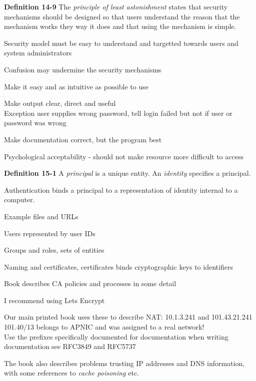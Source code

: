 \documentclass[Screen16to9,17pt]{foils}
\begin{document}

\begin{list1}
\item {\bf Definition 14-9} The \emph{principle of least astonishment} states that security mechanisms should be designed so that users understand the reason that the mechanism works they way it does and that using the mechanism is simple.
\item Security model must be easy to understand and targetted towards users and system administrators
\item Confusion may undermine the security mechanisms
\item Make it easy and as intuitive as possible to use
\item Make output clear, direct and useful\\
Exception user supplies wrong password, tell login failed but not if user or password was wrong
\item Make documentation correct, but the program best
\item Psychological acceptability - should not make resource more difficult to access
\end{list1}





\begin{list1}
\item
\item {\bf Definition 15-1} A \emph{principal} is a unique entity. An \emph{identity} specifies a principal.
\item Authentication binds a principal to a representation of identity internal to a computer.
\item Example files and URLs
\item Users represented by user IDs
\item Groups and roles, sets of entities

\end{list1}



\begin{list1}
\item Naming and certificates, certificates binds cryptographic keys to identifiers
\item Book describes CA policies and processes in some detail
\item I recommend using Lets Encrypt 
\item Our main printed book uses these to describe NAT: 10.1.3.241 and 101.43.21.241\\
101.40/13 belongs to APNIC and was assigned to a real network!\\
Use the prefixes specifically documented for documentation when writing documentation🙏see RFC3849 and RFC5737
\item The book also describes problems trusting IP addresses and DNS information, with some references to \emph{cache poisoning} etc.
\end{list1}
\end{document}
